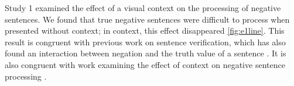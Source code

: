 \documentclass[10pt,letterpaper]{article}
\begin{document}




Study 1 examined the effect of a visual context on the processing of negative sentences.  We found that true negative sentences were difficult to process when presented without context; in context, this effect disappeared \ref{fig:e1line}.  This result is congruent with previous work on sentence verification, which has also found an interaction between negation and the truth value of a sentence \cite{hclark1972, carpenter1975, just1971, just1976}.  It is also congruent with work examining the effect of context on negative sentence processing \cite{wason1965, glenberg1999, ludtke2006, nieuwland2008, dale2011}.  
\end{document}
